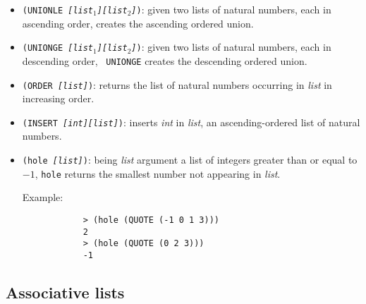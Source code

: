 \begin{itemize}
	\item {\tt (UNIONLE {\it [list$_1$][list$_2$]})}:
		given two lists of natural numbers, each in ascending order, creates the
		ascending ordered union. 
	\item {\tt (UNIONGE {\it [list$_1$][list$_2$]})}:
		given two lists of natural numbers, each in descending order, {\tt
		UNIONGE} creates the descending ordered union.
	\item {\tt (ORDER {\it [list]})}:
		returns the list of natural numbers occurring in {\it list} in
		increasing order.
	\item {\tt (INSERT {\it [int][list]})}:
		inserts {\it int} in {\it list}, an ascending-ordered list of natural
		numbers.
	\item {\tt (hole {\it [list]})}:
		being {\it list} argument a list of integers greater than or equal to
		$-1$, {\tt hole} returns the smallest number not appearing in
		{\it list}.
		
		Example:
		\begin{verbatim}
			> (hole (QUOTE (-1 0 1 3)))
			2
			> (hole (QUOTE (0 2 3)))
			-1
		\end{verbatim}
\end{itemize}


\subsection{Associative lists}

